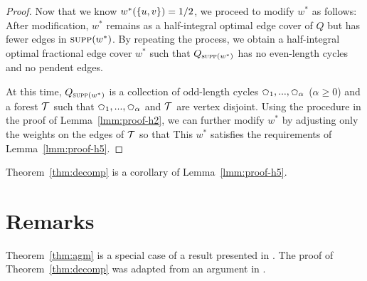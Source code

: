 \begin{proof}
    \vgap

    Now that we know $w^*(\{u, v\}) = 1/2$, we proceed to modify $w^*$ as follows:
    After modification, $w^*$ remains as a half-integral optimal edge cover of $Q$ but has fewer edges in $\textsc{supp}(w^*)$. By repeating the process, we obtain a half-integral optimal fractional edge cover $w^*$ such that $Q_{\textsc{supp}(w^*)}$ has no even-length cycles and no pendent edges.

    \vgap

    At this time, $Q_{\textsc{supp}(w^*)}$ is a collection of odd-length cycles $\mycycle_1, ..., \mycycle_\alpha$ ($\alpha \ge 0$) and a forest $\mathcal{T}$ such that $\mycycle_1, ..., \mycycle_\alpha$ and $\mathcal{T}$ are vertex disjoint. Using the procedure in the proof of Lemma~\ref{lmm:proof-h2}, we can further modify $w^*$ by adjusting only the weights on the edges of $\mathcal{T}$ so that
    This $w^*$ satisfies the requirements of Lemma~\ref{lmm:proof-h5}.
\end{proof}

Theorem~\ref{thm:decomp} is a corollary of Lemma~\ref{lmm:proof-h5}.

\section{Remarks}

Theorem~\ref{thm:agm} is a special case of a result presented in \cite{agm13}. The proof of Theorem~\ref{thm:decomp} was adapted from an argument in \cite{akk19}.




